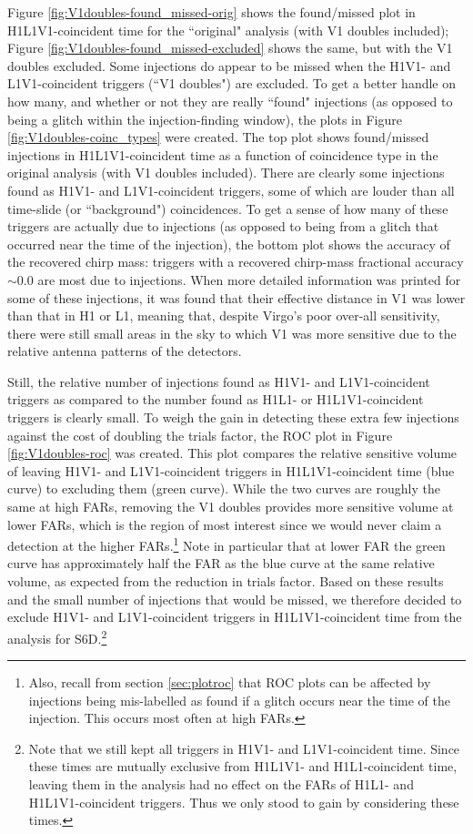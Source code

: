 Figure \ref{fig:V1doubles-found_missed-orig} shows the found/missed plot in
H1L1V1-coincident time for the ``original" analysis (with V1 doubles included);
Figure \ref{fig:V1doubles-found_missed-excluded} shows the same, but with the
V1 doubles excluded. Some injections do appear to be missed when the H1V1- and
L1V1-coincident triggers (``V1 doubles") are excluded. To get a better handle
on how many, and whether or not they are really ``found" injections (as opposed
to being a glitch within the injection-finding window), the plots in Figure
\ref{fig:V1doubles-coinc_types} were created. The top plot shows found/missed
injections in H1L1V1-coincident time as a function of coincidence type in the
original analysis (with V1 doubles included). There are clearly some injections
found as H1V1- and L1V1-coincident triggers, some of which are louder than all
time-slide (or ``background") coincidences. To get a sense of how many of these
triggers are actually due to injections (as opposed to being from a glitch that
occurred near the time of the injection), the bottom plot shows the accuracy of
the recovered chirp mass: triggers with a recovered chirp-mass fractional
accuracy $\sim0.0$ are most due to injections. When more detailed information
was printed for some of these injections, it was found that their effective
distance in V1 was lower than that in H1 or L1, meaning that, despite Virgo's
poor over-all sensitivity, there were still small areas in the sky to which V1
was more sensitive due to the relative antenna patterns of the detectors.

Still, the relative number of injections found as H1V1- and L1V1-coincident
triggers as compared to the number found as H1L1- or H1L1V1-coincident triggers
is clearly small. To weigh the gain in detecting these extra few injections
against the cost of doubling the trials factor, the ROC plot in  Figure
\ref{fig:V1doubles-roc} was created. This plot compares the relative sensitive
volume of leaving H1V1- and L1V1-coincident triggers in H1L1V1-coincident time
(blue curve) to excluding them (green curve). While the two curves are roughly
the same at high \acp{FAR}, removing the V1 doubles provides more sensitive
volume at lower \acp{FAR}, which is the region of most interest since we would
never claim a detection at the higher \acp{FAR}.\footnote{Also, recall from
section \ref{sec:plotroc} that ROC plots can be affected by injections being
mis-labelled as found if a glitch occurs near the time of the injection. This
occurs most often at high \acp{FAR}.} Note in particular that at lower \ac{FAR}
the green curve has approximately half the \ac{FAR} as the blue curve at the
same relative volume, as expected from the reduction in trials factor. Based on
these results and the small number of injections that would be missed, we
therefore decided to exclude H1V1- and L1V1-coincident triggers in
H1L1V1-coincident time from the analysis for S6D.\footnote{Note that we still
kept all triggers in H1V1- and L1V1-coincident time. Since these times are
mutually exclusive from H1L1V1- and H1L1-coincident time, leaving them in the
analysis had no effect on the \acp{FAR} of H1L1- and H1L1V1-coincident
triggers. Thus we only stood to gain by considering these times.}

